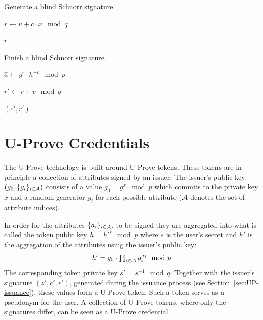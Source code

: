 \begin{algorithm}[H]
  \caption{Generate a blind Schnorr signature.}
  \label{alg:Schnorr-blind-sign}
  \addtolength{\baselineskip}{1mm}
  \begin{algorithmic}[1]
      \State $r \gets u + c \cdot x \mod q$

      \Return $r$
    \EndFunction
  \end{algorithmic}
\end{algorithm}
\begin{algorithm}
  \caption{Finish a blind Schnorr signature.}
  \label{alg:Schnorr-finish}
  \addtolength{\baselineskip}{1mm}
  \begin{algorithmic}[1]
      \State $\hat{a} \gets g^r \cdot h^{-c} \mod p$
        \Return {}
      \EndIf

      \State $r' \gets r + v \mod q$

      \Return $(c', r')$
    \EndFunction
  \end{algorithmic}
\end{algorithm}

\section{U-Prove Credentials}

The U-Prove technology is built around U-Prove tokens. These tokens are in
principle a collection of attributes signed by an issuer. The issuer's public
key $(g_0, \{g_i\}_{i \in \mathcal{A}})$ consists of a value $g_0 = g^x \mod p$ which
commits to the private key $x$ and a random generator $g_i$ for each possible
attribute ($\mathcal{A}$ denotes the set of attribute indices).

In order for the attributes $\{a_i\}_{i \in \mathcal{A}}$, to be signed they are
aggregated into what is called the token public key $h = h'^s \mod p$ where $s$
is the user's secret and $h'$ is the aggregation of the attributes using the
issuer's public key:
\begin{equation}\label{eqn:UP-attribute-aggregation}
  h' = g_0 \cdot \textstyle\prod_{i \in \mathcal{A}} g_i^{a_i} \mod p
\end{equation}
The corresponding token private key $s' = s^{-1} \mod q$. Together with the
issuer's signature $(z', c', r')$, generated during the issuance process (see
Section~\ref{sec:UP-issuance}), these values form a U-Prove token. Such a token
serves as a pseudonym for the user. A collection of U-Prove tokens, where only
the signatures differ, can be seen as a U-Prove credential.

